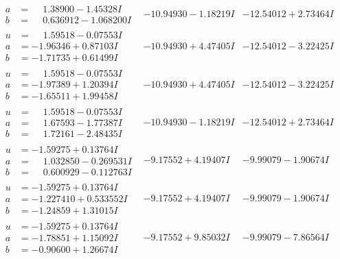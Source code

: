\documentclass[1p]{elsarticle_modified}
\theoremstyle{definition}
\begin{document}
$$\begin{array}{c|c|c}
\begin{aligned}
a &= \phantom{-}1.38900 - 1.45328 I \\
b &= \phantom{-}0.636912 - 1.068200 I\end{aligned}
 & -10.94930 - 1.18219 I & -12.54012 + 2.73464 I \\ \hline\begin{aligned}
u &= \phantom{-}1.59518 - 0.07553 I \\
a &= -1.96346 + 0.87103 I \\
b &= -1.71735 + 0.61499 I\end{aligned}
 & -10.94930 + 4.47405 I & -12.54012 - 3.22425 I \\ \hline\begin{aligned}
u &= \phantom{-}1.59518 - 0.07553 I \\
a &= -1.97389 + 1.20394 I \\
b &= -1.65511 + 1.99458 I\end{aligned}
 & -10.94930 + 4.47405 I & -12.54012 - 3.22425 I \\ \hline\begin{aligned}
u &= \phantom{-}1.59518 - 0.07553 I \\
a &= \phantom{-}1.67593 - 1.77387 I \\
b &= \phantom{-}1.72161 - 2.48435 I\end{aligned}
 & -10.94930 - 1.18219 I & -12.54012 + 2.73464 I \\ \hline\begin{aligned}
u &= -1.59275 + 0.13764 I \\
a &= \phantom{-}1.032850 - 0.269531 I \\
b &= \phantom{-}0.600929 - 0.112763 I\end{aligned}
 & -9.17552 + 4.19407 I & -9.99079 - 1.90674 I \\ \hline\begin{aligned}
u &= -1.59275 + 0.13764 I \\
a &= -1.227410 + 0.533552 I \\
b &= -1.24859 + 1.31015 I\end{aligned}
 & -9.17552 + 4.19407 I & -9.99079 - 1.90674 I \\ \hline\begin{aligned}
u &= -1.59275 + 0.13764 I \\
a &= -1.78851 + 1.15092 I \\
b &= -0.90600 + 1.26674 I\end{aligned}
 & -9.17552 + 9.85032 I & -9.99079 - 7.86564 I \\ \hline\begin{aligned}

\end{aligned}
\end{array}$$
\end{document}
